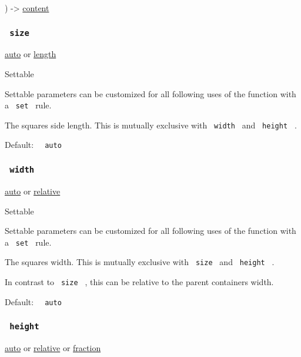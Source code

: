 ) -\textgreater{} \href{/docs/reference/foundations/content/}{content}

\subsubsection{\texorpdfstring{\texttt{\ size\ }}{ size }}\label{parameters-size}

\href{/docs/reference/foundations/auto/}{auto} {or}
\href{/docs/reference/layout/length/}{length}

{{ Settable }}

\label{parameters-size-settable-tooltip}
Settable parameters can be customized for all following uses of the
function with a \texttt{\ set\ } rule.

The square\textquotesingle s side length. This is mutually exclusive
with \texttt{\ width\ } and \texttt{\ height\ } .

Default: \texttt{\ }{\texttt{\ auto\ }}\texttt{\ }

\subsubsection{\texorpdfstring{\texttt{\ width\ }}{ width }}\label{parameters-width}

\href{/docs/reference/foundations/auto/}{auto} {or}
\href{/docs/reference/layout/relative/}{relative}

{{ Settable }}

\label{parameters-width-settable-tooltip}
Settable parameters can be customized for all following uses of the
function with a \texttt{\ set\ } rule.

The square\textquotesingle s width. This is mutually exclusive with
\texttt{\ size\ } and \texttt{\ height\ } .

In contrast to \texttt{\ size\ } , this can be relative to the parent
container\textquotesingle s width.

Default: \texttt{\ }{\texttt{\ auto\ }}\texttt{\ }

\subsubsection{\texorpdfstring{\texttt{\ height\ }}{ height }}\label{parameters-height}

\href{/docs/reference/foundations/auto/}{auto} {or}
\href{/docs/reference/layout/relative/}{relative} {or}
\href{/docs/reference/layout/fraction/}{fraction}

